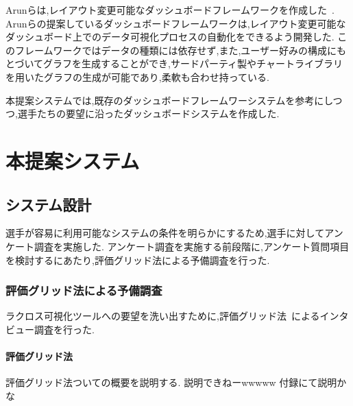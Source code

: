 \documentclass[sotsuron]{kuee}
\begin{document}
	Arunらは,レイアウト変更可能なダッシュボードフレームワークを作成した~\cite{dashboard}.  
	Arunらの提案しているダッシュボードフレームワークは,レイアウト変更可能なダッシュボード上でのデータ可視化プロセスの自動化をできるよう開発した.  
	このフレームワークではデータの種類には依存せず,また,ユーザー好みの構成にもとづいてグラフを生成することができ,サードパーティ製やチャートライブラリを用いたグラフの生成が可能であり,柔軟も合わせ持っている.  
	
	本提案システムでは,既存のダッシュボードフレームワーシステムを参考にしつつ,選手たちの要望に沿ったダッシュボードシステムを作成した.  

\chapter{本提案システム}
	\section{システム設計}
		選手が容易に利用可能なシステムの条件を明らかにするため,選手に対してアンケート調査を実施した.  
		アンケート調査を実施する前段階に,アンケート質問項目を検討するにあたり,評価グリッド法による予備調査を行った.  
		\subsection{評価グリッド法による予備調査}
			ラクロス可視化ツールへの要望を洗い出すために,評価グリッド法~\cite{EGM}によるインタビュー調査を行った.  
			\subsubsection{評価グリッド法}
				評価グリッド法ついての概要を説明する.  
				説明できねーwwwww
				付録にて説明かな
\end{document}
